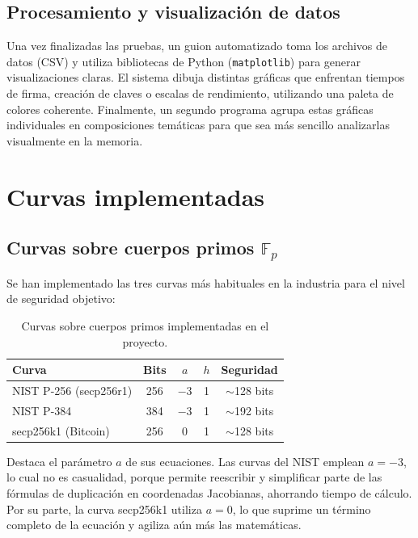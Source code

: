 \subsection{Procesamiento y visualización de datos}
\label{subsec:impl-visualizacion}

Una vez finalizadas las pruebas, un guion automatizado toma los archivos de datos (CSV) y utiliza bibliotecas de Python (\texttt{matplotlib}) para generar visualizaciones claras. 
El sistema dibuja distintas gráficas que enfrentan tiempos de firma, creación de claves o escalas de rendimiento, utilizando una paleta de colores coherente. Finalmente, un segundo 
programa agrupa estas gráficas individuales en composiciones temáticas para que sea más sencillo analizarlas visualmente en la memoria.


\section{Curvas implementadas}
\label{sec:impl-curvas}

\subsection{Curvas sobre cuerpos primos $\mathbb{F}_p$}
\label{subsec:impl-curvas-primas}

Se han implementado las tres curvas más habituales en la industria para el nivel de seguridad objetivo:

\begin{table}[htbp]
\centering
\begin{tabular}{lcccc}
\hline
\textbf{Curva} & \textbf{Bits} & \textbf{$a$} & \textbf{$h$} & \textbf{Seguridad} \\
\hline
NIST P-256 (secp256r1) & 256 & $-3$ & 1 & $\sim$128 bits \\
NIST P-384             & 384 & $-3$ & 1 & $\sim$192 bits \\
secp256k1 (Bitcoin)    & 256 & $0$  & 1 & $\sim$128 bits \\
\hline
\end{tabular}
\caption{Curvas sobre cuerpos primos implementadas en el proyecto.}
\label{tab:curvas-primas-impl}
\end{table}

Destaca el parámetro $a$ de sus ecuaciones. Las curvas del NIST emplean $a = -3$, lo cual no es casualidad, porque permite reescribir y simplificar parte de las fórmulas de duplicación en 
coordenadas Jacobianas, ahorrando tiempo de cálculo. Por su parte, la curva secp256k1 utiliza $a = 0$, lo que suprime un término completo de la ecuación y agiliza aún más las matemáticas.

